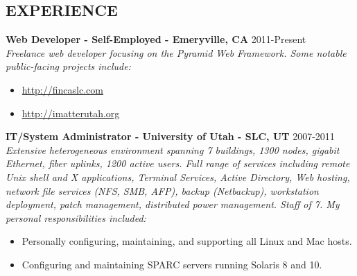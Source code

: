 \documentclass[line,margin]{res}
\begin{document}
\date{\today}
\address{\href{mailto:parker@parkerpinette.com}{parker@parkerpinette.com} \\ (801) 638-8611 \\ \url{https://github.com/ppinette}}

\begin{resume}


\section{EXPERIENCE}
 {\bf Web Developer - Self-Employed - Emeryville, CA} \hfill 2011-Present\\
 {\sl Freelance web developer focusing on the Pyramid Web Framework. Some notable public-facing projects include:}
  \begin{itemize} \itemsep -2pt %
  \item \url{http://fincaslc.com}  %
  \item \url{http://imatterutah.org}
  \end{itemize}
 {\bf IT/System Administrator - University of Utah - SLC, UT} \hfill 2007-2011\\
 {\sl Extensive heterogeneous environment spanning 7 buildings, 1300 nodes, gigabit Ethernet, fiber uplinks, 1200 active users. Full range of services including remote Unix shell and X applications, Terminal Services, Active Directory, Web hosting, network file services (NFS, SMB, AFP), backup (Netbackup), workstation deployment, patch management, distributed power management. Staff of 7. My personal responsibilities included:}
   \begin{itemize} \itemsep -2pt
   \item Personally configuring, maintaining, and supporting all Linux and Mac hosts.
   \item Configuring and maintaining SPARC servers running Solaris 8 and 10.

\end{itemize}
\end{resume}
\end{document}
